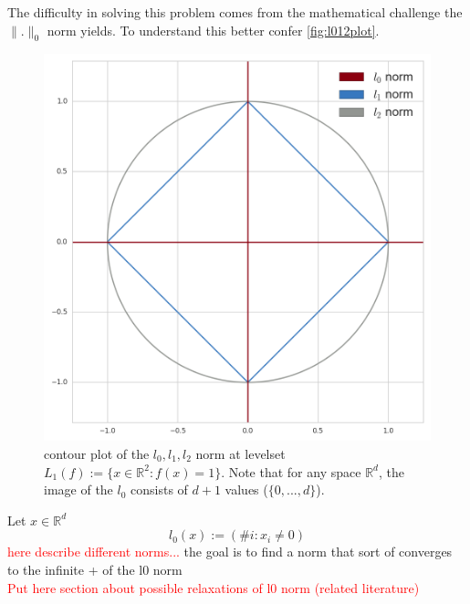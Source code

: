 \documentclass{article}
\newcommand{\R}{\mathbb{R}}
\begin{document}
The difficulty in solving this problem comes from the mathematical challenge the $\| . \|_0$ norm yields. To understand this better confer \autoref{fig:l012plot}.
\begin{figure}
\centering
\includegraphics[scale=0.3]{img/l012_norms.png}
\caption{contour plot of the $l_0, l_1, l_2$ norm at levelset $L_1(f) := \lbrace x \in \R^2 : f(x) = 1 \rbrace $. Note that for any space $\R^d$, the image of the $l_0$ consists of $d+1$ values ($\lbrace 0, ..., d \rbrace $).}
\label{fig:l012plot}
\end{figure}
Let $x \in \R^d$
\[
l_0(x) := (\#i : x_i \not= 0)
\]
\textcolor{red}{here describe different norms...}
the goal is to find a norm that sort of converges to the infinite + of the l0 norm
\\

\textcolor{red}{Put here section about possible relaxations of l0 norm (related literature)}
\end{document}
